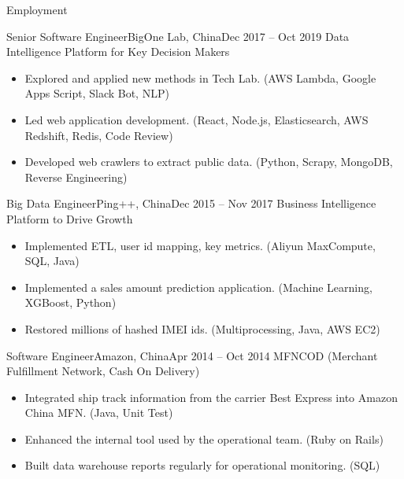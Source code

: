 \documentclass[]{mcdowellcv}
\begin{document}
	\makeheader
	
	\begin{cvsection}{Employment}
		\begin{cvsubsection}{Senior Software Engineer}{BigOne Lab, China}{Dec 2017 – Oct 2019}
			Data Intelligence Platform for Key Decision Makers
			\begin{itemize}
				\item Explored and applied new methods in Tech Lab. (AWS Lambda, Google Apps Script, Slack Bot, NLP)
				\item Led web application development. (React, Node.js, Elasticsearch, AWS Redshift, Redis, Code Review)
				\item Developed web crawlers to extract public data. (Python, Scrapy, MongoDB, Reverse Engineering)
			\end{itemize}
		\end{cvsubsection}

		\begin{cvsubsection}{Big Data Engineer}{Ping++, China}{Dec 2015 – Nov 2017}
			Business Intelligence Platform to Drive Growth
			\begin{itemize}
				\item Implemented ETL, user id mapping, key metrics. (Aliyun MaxCompute, SQL, Java)
				\item Implemented a sales amount prediction application. (Machine Learning, XGBoost, Python)
				\item Restored millions of hashed IMEI ids. (Multiprocessing, Java, AWS EC2)
			\end{itemize}
		\end{cvsubsection}
		
		\begin{cvsubsection}{Software Engineer}{Amazon, China}{Apr 2014 – Oct 2014}
			MFNCOD (Merchant Fulfillment Network, Cash On Delivery)
			\begin{itemize}
				\item Integrated ship track information from the carrier Best Express into Amazon China MFN. (Java, Unit Test)
				\item Enhanced the internal tool used by the operational team. (Ruby on Rails)
				\item Built data warehouse reports regularly for operational monitoring. (SQL)
			\end{itemize}
		\end{cvsubsection}
		

\end{cvsection}
\end{document}
